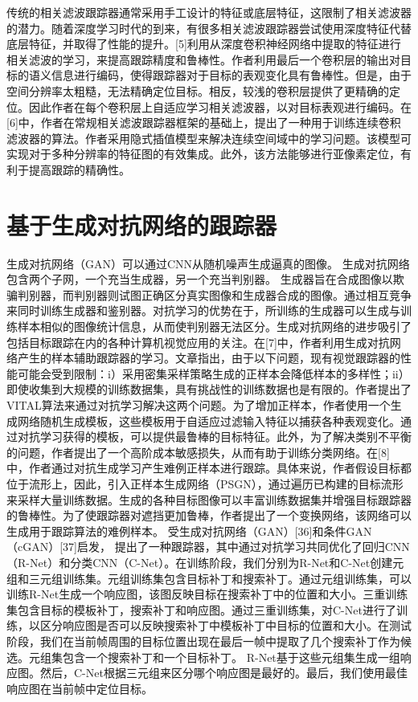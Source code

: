 传统的相关滤波跟踪器通常采用手工设计的特征或底层特征，这限制了相关滤波器的潜力。随着深度学习时代的到来，有很多相关滤波跟踪器尝试使用深度特征代替底层特征，并取得了性能的提升。[5]利用从深度卷积神经网络中提取的特征进行相关滤波的学习，来提高跟踪精度和鲁棒性。作者利用最后一个卷积层的输出对目标的语义信息进行编码，使得跟踪器对于目标的表观变化具有鲁棒性。但是，由于空间分辨率太粗糙，无法精确定位目标。相反，较浅的卷积层提供了更精确的定位。因此作者在每个卷积层上自适应学习相关滤波器，以对目标表观进行编码。在[6]中，作者在常规相关滤波跟踪器框架的基础上，提出了一种用于训练连续卷积滤波器的算法。作者采用隐式插值模型来解决连续空间域中的学习问题。该模型可实现对于多种分辨率的特征图的有效集成。此外，该方法能够进行亚像素定位，有利于提高跟踪的精确性。
\section{基于生成对抗网络的跟踪器}
生成对抗网络（GAN）可以通过CNN从随机噪声生成逼真的图像。 生成对抗网络包含两个子网，一个充当生成器，另一个充当判别器。 生成器旨在合成图像以欺骗判别器，而判别器则试图正确区分真实图像和生成器合成的图像。通过相互竞争来同时训练生成器和鉴别器。对抗学习的优势在于，所训练的生成器可以生成与训练样本相似的图像统计信息，从而使判别器无法区分。生成对抗网络的进步吸引了包括目标跟踪在内的各种计算机视觉应用的关注。在[7]中，作者利用生成对抗网络产生的样本辅助跟踪器的学习。文章指出，由于以下问题，现有视觉跟踪器的性能可能会受到限制：i）采用密集采样策略生成的正样本会降低样本的多样性；ii）即使收集到大规模的训练数据集，具有挑战性的训练数据也是有限的。作者提出了VITAL算法来通过对抗学习解决这两个问题。为了增加正样本，作者使用一个生成网络随机生成模板，这些模板用于自适应过滤输入特征以捕获各种表观变化。通过对抗学习获得的模板，可以提供最鲁棒的目标特征。此外，为了解决类别不平衡的问题，作者提出了一个高阶成本敏感损失，从而有助于训练分类网络。在[8]中，作者通过对抗生成学习产生难例正样本进行跟踪。具体来说，作者假设目标都位于流形上，因此，引入正样本生成网络（PSGN），通过遍历已构建的目标流形来采样大量训练数据。生成的各种目标图像可以丰富训练数据集并增强目标跟踪器的鲁棒性。为了使跟踪器对遮挡更加鲁棒，作者提出了一个变换网络，该网络可以生成用于跟踪算法的难例样本。%
受生成对抗网络（GAN）[36]和条件GAN（cGAN）[37]启发， \cite{AdversarialDeep} 提出了一种跟踪器，其中通过对抗学习共同优化了回归CNN（R-Net）和分类CNN（C-Net）。在训练阶段，我们分别为R-Net和C-Net创建元组和三元组训练集。元组训练集包含目标补丁和搜索补丁。通过元组训练集，可以训练R-Net生成一个响应图，该图反映目标在搜索补丁中的位置和大小。三重训练集包含目标的模板补丁，搜索补丁和响应图。通过三重训练集，对C-Net进行了训练，以区分响应图是否可以反映搜索补丁中模板补丁中目标的位置和大小。在测试阶段，我们在当前帧周围的目标位置出现在最后一帧中提取了几个搜索补丁作为候选。元组集包含一个搜索补丁和一个目标补丁。 R-Net基于这些元组集生成一组响应图。然后，C-Net根据三元组来区分哪个响应图是最好的。最后，我们使用最佳响应图在当前帧中定位目标。  %


